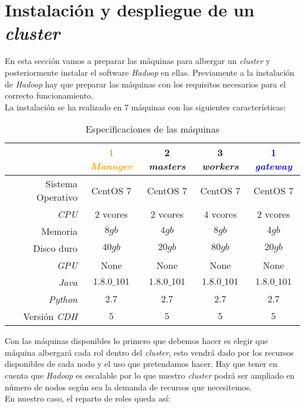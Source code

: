 
\chapter{Instalación y despliegue de un \textit{cluster}}
En esta sección vamos a preparar las máquinas para albergar un \textit{cluster} y 
posteriormente instalar el software \textit{Hadoop} en ellas.
Previamente a la instalación de \textit{Hadoop} hay que preparar las máquinas con los requisitos 
necesarios para el correcto funcionamiento.\\
La instalación se ha realizado en 7 máquinas con las siguientes características:

\begin{table}[!htbp]
  \centering
  \begin{tabular}{|r|c|c|c|c|} %
    \hline
    & \textcolor{Orange}{1 \textit{Manager}} & \textcolor{OliveGreen}{2 \textit{masters}} & \textcolor{BrickRed}{3 \textit{workers}} & \textcolor{blue}{1 \textit{gateway}} \\ \hline
    Sistema Operativo & CentOS 7 & CentOS 7 & CentOS 7 & CentOS 7 \\ \hline
    \textit{CPU} & 2 vcores & 2 vcores & 4 vcores & 2 vcores \\ \hline
    Memoria & $8gb$ & $4gb$ & $8gb$ & $4gb$ \\ \hline
    Disco duro & $40gb$ & $20gb$ & $80gb$ & $20gb$ \\ \hline
    \textit{GPU} & None & None & None & None \\ \hline
    \textit{Java} & $1.8.0\_101$ & $1.8.0\_101$ & $1.8.0\_101$ & $1.8.0\_101$ \\ \hline
    \textit{Python} & $2.7$ & $2.7$ & $2.7$ & $2.7$ \\ \hline
    Versión \textit{CDH} & $5$ & $5$ & $5$ & $5$ \\ \hline
  \end{tabular}
  \caption[\textit{Hardware} de las máquinas del \textit{cluster}]{Especificaciones de las máquinas}
  \label{cluster_machines_specification}
\end{table}

Con las máquinas disponibles lo primero que debemos hacer es elegir que máquina albergará cada rol dentro 
del \textit{cluster}, esto vendrá dado por los recursos disponibles de cada nodo y el uso que pretendamos hacer.
Hay que tener en cuenta que \textit{Hadoop} es escalable por lo que nuestro \textit{cluster} podrá 
ser ampliado en número de nodos según sea la demanda de recursos que necesitemos.\\
En nuestro caso, el reparto de roles queda así:

